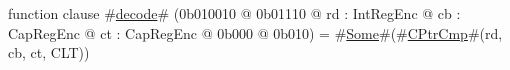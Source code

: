 function clause #\hyperref[sailMIPSzdecode]{decode}# (0b010010 @ 0b01110 @ rd : IntRegEnc @ cb : CapRegEnc @ ct : CapRegEnc @ 0b000 @ 0b010) = #\hyperref[sailMIPSzSome]{Some}#(#\hyperref[sailMIPSzCPtrCmp]{CPtrCmp}#(rd, cb, ct, CLT))
